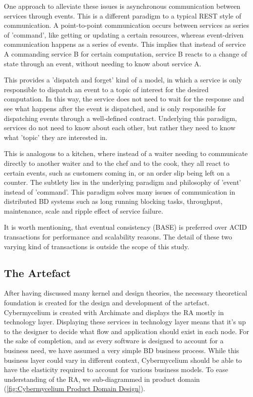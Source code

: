 \documentclass[review]{elsarticle}
\begin{document}
One approach to alleviate these issues is asynchronous communication between services through events. This is a different paradigm to a typical REST style of communication. A point-to-point communication occurs between services as series of 'command', like getting or updating a certain resources, whereas event-driven communication happens as a series of events. This implies that instead of service A commanding service B for certain computation, service B reacts to a change of state through an event, without needing to know about service A.

This provides a 'dispatch and forget' kind of a model, in which a service is only responsible to dispatch an event to a topic of interest for the desired computation. In this way, the service does not need to wait for the response and see what happens after the event is dispatched, and is only responsible for dispatching events through a well-defined contract. Underlying this paradigm, services do not need to know about each other, but rather they need to know what 'topic' they are interested in.

This is analogous to a kitchen, where instead of a waiter needing to communicate directly to another waiter and to the chef and to the cook, they all react to certain events, such as customers coming in, or an order slip being left on a counter. The subtlety lies in the underlying paradigm and philosophy of 'event' instead of 'command'. This paradigm solves many issues of communication in distributed BD systems such as long running blocking tasks, throughput, maintenance, scale and ripple effect of service failure.

It is worth mentioning, that eventual consistency (BASE) is preferred over ACID transactions for performance and scalability reasons. The detail of these two varying kind of transactions is outside the scope of this study.

\subsection{The Artefact} \label{the-artifact}

After having discussed many kernel and design theories, the necessary theoretical foundation is created for the design and development of the artefact. Cybermycelium is created with Archimate and displays the RA mostly in technology layer. Displaying these services in technology layer means that it's up to the designer to decide what flow and application should exist in each node. For the sake of completion, and as every software is designed to account for a business need, we have assumed a very simple BD business process. While this business layer could vary in different context, Cybermycelium should be able to have the elasticity required to account for various business models. To ease understanding of the RA, we sub-diagrammed in product domain (\ref{fig:Cybermycelium Product Domain Design}).
\end{document}
